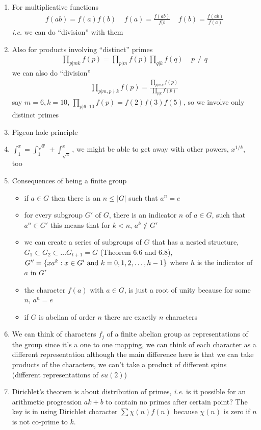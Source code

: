 \documentclass[aps,preprint,preprintnumbers,nofootinbib,showpacs,prd]{revtex4-1}
\newcommand{\ie}{{\it i.e.} }
\newcommand{\bit}{\begin{itemize}}
\newcommand{\eit}{\end{itemize}}
\newcommand{\nbea}{\begin{eqnarray*}}
\newcommand{\neea}{\end{eqnarray*}}
\begin{document}
\begin{enumerate}
\item For multiplicative functions
%
\nbea
f(ab) = f(a)f(b) ~~~~~ f(a) = \frac{f(ab)}{f(b} ~~~~~ f(b) = \frac{f(ab)}{f(a)}
\neea
%
\ie we can do ``division'' with them

\item Also for products involving ``distinct'' primes
%
\nbea
\prod_{p|mk} f(p) = \prod_{p|m}f(p) \prod_{q|k}f(q) ~~~~~ p \neq q
\neea
%
we can also do ``division''
%
\nbea
\prod_{p|m, p\nmid k} f(p) = \frac{\prod_{p|mk}f(p)}{\prod_{p|k}f(p)}
\neea
%
say $m = 6, k = 10$, $\prod_{p|6\cdot10} f(p) = f(2) f(3) f(5)$, so we involve only distinct primes

\item Pigeon hole principle

\item $\int_1^x = \int_1^{\sqrt{x}} + \int_{\sqrt{x}}^x$, we might be able to get away with other powers, $x^{1/k}$, too

\item Consequences of being a finite group
\bit
\item if $a \in G$ then there is an $n \le |G|$ such that $a^n = e$
\item for every subgroup $G'$ of $G$, there is an indicator $n$ of $a \in G$, such that $a^n \in G'$ this means that for $k < n$, $a^k \not\in G'$
\item we can create a series of subgroups of $G$ that has a nested structure, $G_1 \subset G_2 \subset \dots G_{t+1} = G$ (Theorem 6.6 and 6.8), $G'' = \{xa^k: x \in G' ~{\rm and} ~ k = 0,1,2,\dots,h-1\}$ where $h$ is the indicator of $a$ in $G'$
\item the character $f(a)$ with $a \in G$, is just a root of unity because for some $n$, $a^n = e$
\item if $G$ is abelian of order $n$ there are exactly $n$ characters


\eit

\item We can think of characters $f_j$ of a finite abelian group as representations of the group since it's a one to one mapping, we can think of each character as a different representation although the main difference here is that we can take products of the characters, we can't take a product of different spins (different representations of $su(2)$)


\item Dirichlet's theorem is about distribution of primes, \ie is it possible for an arithmetic progression $ak + b$ to contain no primes after certain point? The key is in using Dirichlet character $\sum \chi(n) f(n)$ because $\chi(n)$ is zero if $n$ is not co-prime to $k$.


\end{enumerate}
\end{document}
